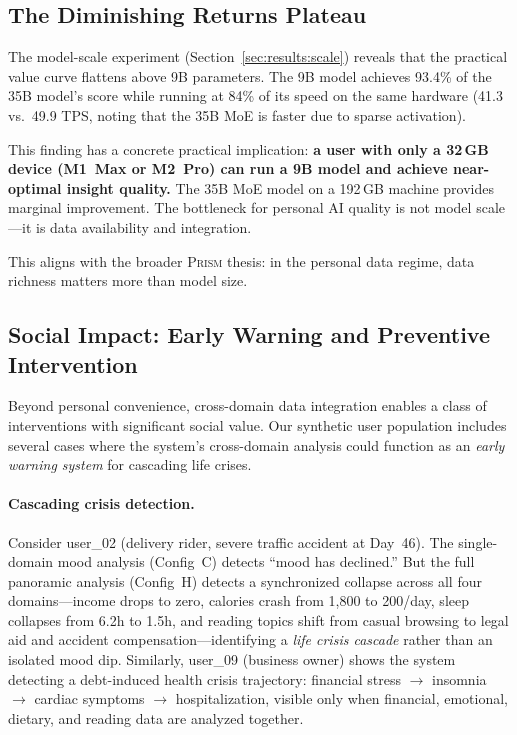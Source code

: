 \documentclass[11pt,a4paper]{article}
\newcommand{\echostream}{\textsc{Prism}}
\begin{document}
\subsection{The Diminishing Returns Plateau}

The model-scale experiment (Section~\ref{sec:results:scale}) reveals that
the practical value curve flattens above 9B parameters. The 9B model achieves
93.4\% of the 35B model's score while running at 84\% of its speed on the
same hardware (41.3 vs.\ 49.9 TPS, noting that the 35B MoE is faster due to
sparse activation).

This finding has a concrete practical implication: \textbf{a user with only a
32\,GB device (M1~Max or M2~Pro) can run a 9B model and achieve near-optimal
insight quality.} The 35B MoE model on a 192\,GB machine provides marginal
improvement. The bottleneck for personal AI quality is not model scale---it
is data availability and integration.

This aligns with the broader \echostream{} thesis: in the personal data
regime, data richness matters more than model size.

\subsection{Social Impact: Early Warning and Preventive Intervention}
\label{sec:discussion:social}

Beyond personal convenience, cross-domain data integration enables a class of
interventions with significant social value. Our synthetic user population
includes several cases where the system's cross-domain analysis could function
as an \emph{early warning system} for cascading life crises.

\paragraph{Cascading crisis detection.}
Consider user\_02 (delivery rider, severe traffic accident at Day~46). The
single-domain mood analysis (Config~C) detects ``mood has declined.'' But the
full panoramic analysis (Config~H) detects a synchronized collapse across
all four domains---income drops to zero, calories crash from 1,800 to 200/day,
sleep collapses from 6.2h to 1.5h, and reading topics shift from casual
browsing to legal aid and accident compensation---identifying a \emph{life
crisis cascade} rather than an isolated mood dip. Similarly, user\_09
(business owner) shows the system detecting a debt-induced health crisis
trajectory: financial stress $\to$ insomnia $\to$ cardiac symptoms $\to$
hospitalization, visible only when financial, emotional, dietary, and reading
data are analyzed together.
\end{document}

